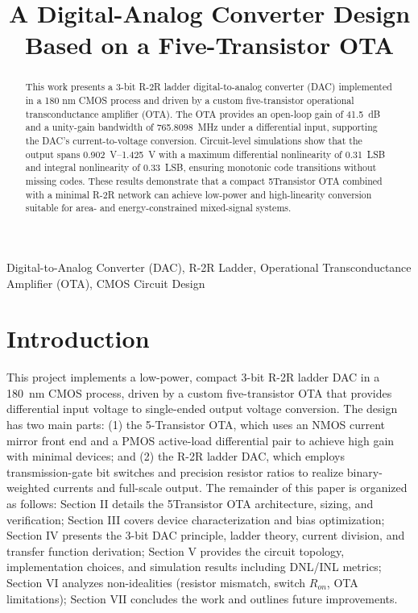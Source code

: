 \documentclass[conference]{IEEEtran}
\begin{document}
\title{A Digital-Analog Converter Design Based on a Five-Transistor OTA\\
}

\author{

}

\maketitle

\begin{abstract}
This work presents a 3-bit R-2R ladder digital-to-analog converter (DAC) implemented in a 180 nm CMOS process and driven by a custom five-transistor operational transconductance amplifier (OTA). 
The OTA provides an open-loop gain of \SI{41.5}{\deci\bel} and a unity-gain bandwidth of \SI{765.8098}{\mega\hertz} under a differential input, supporting the DAC's current-to-voltage conversion. 
Circuit-level simulations show that the output spans \SIrange{0.902}{1.425}{\volt} with a maximum differential nonlinearity of \SI{0.31}{LSB} and integral nonlinearity of \SI{0.33}{LSB}, ensuring monotonic code transitions without missing codes. 
These results demonstrate that a compact 5Transistor OTA combined with a minimal R-2R network can achieve low-power and high-linearity conversion suitable for area- and energy-constrained mixed-signal systems.
\end{abstract}

\begin{IEEEkeywords}
Digital-to-Analog Converter (DAC), R-2R Ladder, Operational Transconductance Amplifier (OTA), CMOS Circuit Design
\end{IEEEkeywords}

\section{Introduction}
This project implements a low-power, compact 3-bit R-2R ladder DAC in a \SI{180}{\nano\meter} CMOS process, driven by a custom five-transistor OTA that provides differential input voltage to single-ended output voltage conversion. 
The design has two main parts: (1) the 5-Transistor OTA, which uses an NMOS current mirror front end and a PMOS active-load differential pair to achieve high gain with minimal devices; and (2) the R-2R ladder DAC, which employs transmission-gate bit switches and precision resistor ratios to realize binary-weighted currents and full-scale output. 
The remainder of this paper is organized as follows: Section II details the 5Transistor OTA architecture, sizing, and verification; Section III covers device characterization and bias optimization; Section IV presents the 3-bit DAC principle, ladder theory, current division, and transfer function derivation; 
Section V provides the circuit topology, implementation choices, and simulation results including DNL/INL metrics; Section VI analyzes non-idealities (resistor mismatch, switch $R_{on}$, OTA limitations); Section VII concludes the work and outlines future improvements.
\end{document}
